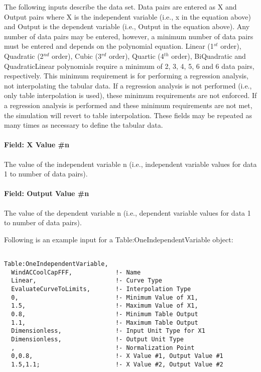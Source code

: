 The following inputs describe the data set. Data pairs are entered as X and Output pairs where X is the independent variable (i.e., x in the equation above) and Output is the dependent variable (i.e., Output in the equation above). Any number of data pairs may be entered, however, a minimum number of data pairs must be entered and depends on the polynomial equation. Linear (1\(^{st}\) order), Quadratic (2\(^{nd}\) order), Cubic (3\(^{rd}\) order), Quartic (4\(^{th}\) order), BiQuadratic and QuadraticLinear polynomials require a minimum of 2, 3, 4, 5, 6 and 6 data pairs, respectively. This minimum requirement is for performing a regression analysis, not interpolating the tabular data. If a regression analysis is not performed (i.e., only table interpolation is used), these minimum requirements are not enforced. If a regression analysis is performed and these minimum requirements are not met, the simulation will revert to table interpolation. These fields may be repeated as many times as necessary to define the tabular data.

\paragraph{Field: X Value \#n}\label{field-x-value-n}

The value of the independent variable n (i.e., independent variable values for data 1 to number of data pairs).

\paragraph{Field: Output Value \#n}\label{field-output-value-n}

The value of the dependent variable n (i.e., dependent variable values for data 1 to number of data pairs).

Following is an example input for a Table:OneIndependentVariable object:

\begin{lstlisting}

Table:OneIndependentVariable,
  WindACCoolCapFFF,            !- Name
  Linear,                      !- Curve Type
  EvaluateCurveToLimits,       !- Interpolation Type
  0,                           !- Minimum Value of X1,
  1.5,                         !- Maximum Value of X1,
  0.8,                         !- Minimum Table Output
  1.1,                         !- Maximum Table Output
  Dimensionless,               !- Input Unit Type for X1
  Dimensionless,               !- Output Unit Type
  ,                            !- Normalization Point
  0,0.8,                       !- X Value #1, Output Value #1
  1.5,1.1;                     !- X Value #2, Output Value #2
\end{lstlisting}

